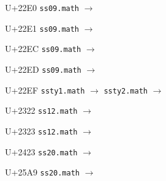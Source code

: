 \documentclass{article}
\begin{document}
\begin{substitutions}
\goodbreak

U+22E0  \linebreak
    \texttt{ss09.math} $\to$  

\goodbreak

U+22E1  \linebreak
    \texttt{ss09.math} $\to$  

\goodbreak

U+22EC  \linebreak
    \texttt{ss09.math} $\to$  

\goodbreak

U+22ED  \linebreak
    \texttt{ss09.math} $\to$  

\goodbreak

U+22EF  \linebreak
    \texttt{ssty1.math} $\to$  \linebreak
    \texttt{ssty2.math} $\to$  

\goodbreak

\end{substitutions}

\clearpage

\begin{substitutions}

U+2322  \linebreak
    \texttt{ss12.math} $\to$  

\goodbreak

U+2323  \linebreak
    \texttt{ss12.math} $\to$  

\goodbreak

\end{substitutions}

\clearpage

\begin{substitutions}

U+2423  \linebreak
    \texttt{ss20.math} $\to$  

\goodbreak

\end{substitutions}

\clearpage

\begin{substitutions}

U+25A9  \linebreak
    \texttt{ss20.math} $\to$  

\goodbreak

\end{substitutions}
\end{document}
